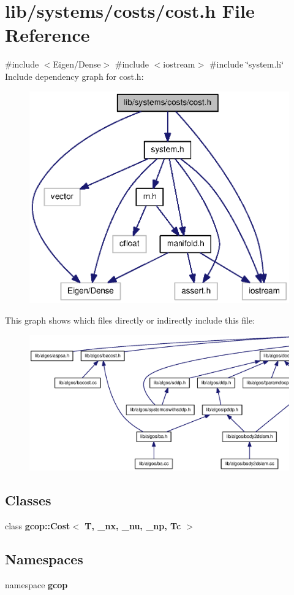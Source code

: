 \section{lib/systems/costs/cost.h \-File \-Reference}
\label{cost_8h}
{\ttfamily \#include $<$\-Eigen/\-Dense$>$}\*
{\ttfamily \#include $<$iostream$>$}\*
{\ttfamily \#include \char`\"{}system.\-h\char`\"{}}\*
\-Include dependency graph for cost.\-h\-:
\nopagebreak
\begin{figure}[H]
\begin{center}
\leavevmode
\includegraphics[width=350pt]{cost_8h__incl}
\end{center}
\end{figure}
\-This graph shows which files directly or indirectly include this file\-:
\nopagebreak
\begin{figure}[H]
\begin{center}
\leavevmode
\includegraphics[width=350pt]{cost_8h__dep__incl}
\end{center}
\end{figure}
\subsection*{\-Classes}
\begin{DoxyCompactItemize}
\item 
class {\bf gcop\-::\-Cost$<$ T, \-\_\-nx, \-\_\-nu, \-\_\-np, Tc $>$}
\end{DoxyCompactItemize}
\subsection*{\-Namespaces}
\begin{DoxyCompactItemize}
\item 
namespace {\bf gcop}
\end{DoxyCompactItemize}
